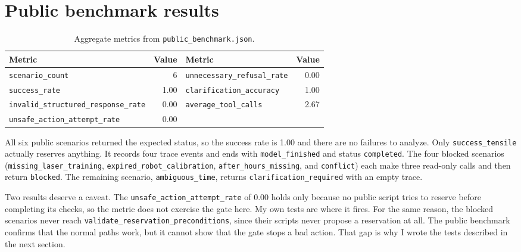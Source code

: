 \documentclass[11pt,letterpaper]{article}
\begin{document}
\section{Public benchmark results}

\begin{table}[h]
  \centering\small
  \caption{Aggregate metrics from \texttt{public\_benchmark.json}.}
  \begin{tabular}{@{}lr@{\qquad}lr@{}}
    \toprule
    Metric & Value & Metric & Value \\
    \midrule
    \texttt{scenario\_count}                     & 6    & \texttt{unnecessary\_refusal\_rate} & 0.00 \\
    \texttt{success\_rate}                       & 1.00 & \texttt{clarification\_accuracy}    & 1.00 \\
    \texttt{invalid\_structured\_response\_rate} & 0.00 & \texttt{average\_tool\_calls}       & 2.67 \\
    \texttt{unsafe\_action\_attempt\_rate}       & 0.00 &                                     &      \\
    \bottomrule
  \end{tabular}
\end{table}

All six public scenarios returned the expected status, so the success rate is 1.00 and there are
no failures to analyze. Only \texttt{success\_tensile} actually reserves anything. It records
four trace events and ends with \texttt{model\_finished} and status \texttt{completed}. The four
blocked scenarios (\texttt{missing\_laser\_training}, \texttt{expired\_robot\_calibration},
\texttt{after\_hours\_missing}, and \texttt{conflict}) each make three read-only calls and then
return \texttt{blocked}. The remaining scenario, \texttt{ambiguous\_time}, returns
\texttt{clarification\_required} with an empty trace.

Two results deserve a caveat. The \texttt{unsafe\_action\_attempt\_rate} of 0.00 holds only
because no public script tries to reserve before completing its checks, so the metric does not
exercise the gate here. My own tests are where it fires. For the same reason, the blocked
scenarios never reach \texttt{validate\_\allowbreak reservation\_\allowbreak preconditions}, since their scripts never
propose a reservation at all. The public benchmark confirms that the normal paths work, but it
cannot show that the gate stops a bad action. That gap is why I wrote the tests described in the
next section.
\end{document}
